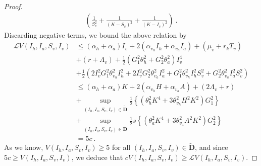 \begin{proof}
\begin{align*}
		\left(
			\frac{1}{S_{v}^{2}} 
			+\frac{1}{(K-S_{v})^{2}} 
			+\frac{1}{(K-I_{v})^{2}}
		\right) ~.
\end{align*}
Discarding negative terms, we bound the above relation by
\begin{align*}
	\mathcal{L}V
	\left(
		I_{h},I_{a},S_{v},I_{v} 
	\right)
	&\leq
	\left(
		\alpha_{h}
		+\alpha_{a}
	\right)
	I_{v} 
	+ 
	2
	\left(
		\alpha_{v_{h}}I_{h}
		+\alpha_{v_{a}}I_{a}
	\right)
	+
	\left(
		\mu_{v} + r_{k}T_{v}
	\right)
	\\ %
	&+ 
	\left( 
		r+\Lambda_{v}
	\right) 
	+ \frac{1}{2}
	\left(
		G_{1}^{2} \theta_{h}^{2}
		+G_{2}^{2} \theta_{a}^{2}
	\right)
	I_{v}^{4}\\
	&+
	\frac{1}{2}
	\left( 
		2I_{v}^{2}G_{1}^{2} \theta_{v_{h}}^{2}I_{h}^{2}
		+ 2I_{v}^{2}G_{2}^{2}\theta_{v_{a}}^{2}I_{a}^{2}
		+ G_{1}^{2}\theta_{v_{h}}^{2}I_{h}^{2}S_{v}^{2} 
		+ G_{2}^{2}\theta_{v_{a}}^{2}I_{a}^{2}S_{v}^{2}
	\right)
	\\
	&\leq 
		\left( 
			\alpha_{h} + \alpha_{a} 
		\right)
		K + 2
		\left(
			\alpha_{v_{h}}H
			+\alpha_{v_{a}}A
		\right)
		+
		\left( 
			2\Lambda_{v}+r
		\right)
		\\ %
	&+ 
	\sup
	\limits_{
		(I_{h},I_{a},S_{v},I_{v})\in \widetilde{\mathbf{D}}
	} 
	\frac{1}{2} 
	\left\{
		\left( 
			\theta_{h}^{2}K^{4}
			+3\theta_{v_{h}}^{2}H^{2}K^{2} 
		\right)
		G_{1}^{2}
	\right\}\\
	&+ 
	\sup
		\limits_{
			(I_{h},I_{a},S_{v},I_{v})\in \widetilde{\mathbf{D}}
		}
		\frac{1}{2} s
		\left\{
			\left( 
				\theta_{a}^{2}K^{4}
				+3\theta_{v_{a}}^{2}A^{2}K^{2} 
			\right)
			G_{2}^{2}
		\right\}
	\\
	&= 5c~.
\end{align*}
As we know, 
	$
		V\left( I_{h},I_{a},S_{v},I_{v} \right)\geq 5
	$ for all 
	$
		\left( I_{h},I_{a},S_{v},I_{v} \right)\in \widetilde{\mathbf{D}}
	$, and since 
	$
		5c \geq V
		\left( 
			I_{h},I_{a},S_{v},I_{v}
		\right)
	$, 
	we deduce that 
	$
		cV
		\left( 
			I_{h},I_{a},S_{v},I_{v} 
		\right)
		\geq 
		\mathcal{L}V
		\left( 
			I_{h},I_{a},S_{v},I_{v} 
		\right)
	$. 
%


\end{proof}
